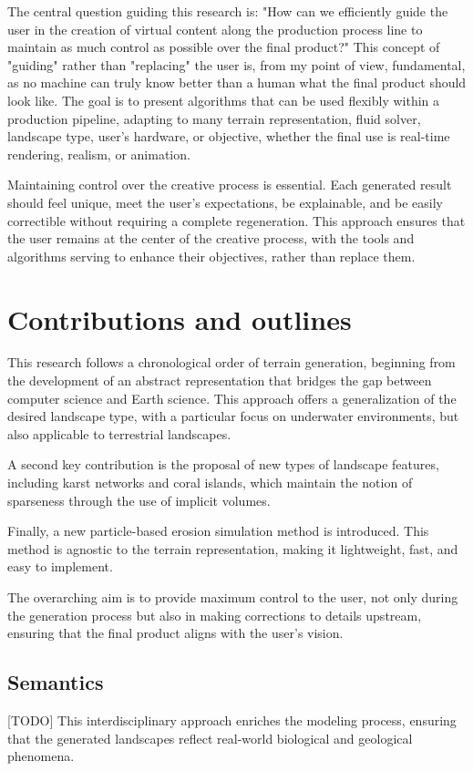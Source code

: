 The central question guiding this research is: "How can we efficiently guide the user in the creation of virtual content along the production process line to maintain as much control as possible over the final product?" This concept of "guiding" rather than "replacing" the user is, from my point of view, fundamental, as no machine can truly know better than a human what the final product should look like. The goal is to present algorithms that can be used flexibly within a production pipeline, adapting to many terrain representation, fluid solver, landscape type, user's hardware, or objective, whether the final use is real-time rendering, realism, or animation.

Maintaining control over the creative process is essential. Each generated result should feel unique, meet the user's expectations, be explainable, and be easily correctible without requiring a complete regeneration. This approach ensures that the user remains at the center of the creative process, with the tools and algorithms serving to enhance their objectives, rather than replace them.

\section{Contributions and outlines}
This research follows a chronological order of terrain generation, beginning from the development of an abstract representation that bridges the gap between computer science and Earth science. This approach offers a generalization of the desired landscape type, with a particular focus on underwater environments, but also applicable to terrestrial landscapes.

A second key contribution is the proposal of new types of landscape features, including karst networks and coral islands, which maintain the notion of sparseness through the use of implicit volumes. 

Finally, a new particle-based erosion simulation method is introduced. This method is agnostic to the terrain representation, making it lightweight, fast, and easy to implement. 

The overarching aim is to provide maximum control to the user, not only during the generation process but also in making corrections to details upstream, ensuring that the final product aligns with the user's vision.

\subsection{Semantics}
[TODO]
This interdisciplinary approach enriches the modeling process, ensuring that the generated landscapes reflect real-world biological and geological phenomena.

